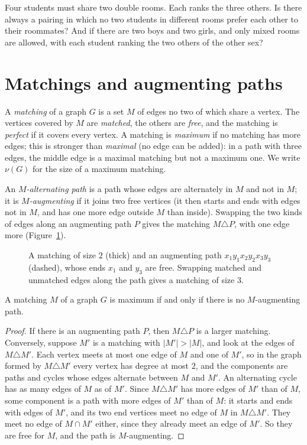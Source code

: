 \begin{think}
Four students must share two double rooms. Each ranks the three others. Is there always a pairing in which no two students
in different rooms prefer each other to their roommates? And if there are two boys and two girls, and only mixed rooms are
allowed, with each student ranking the two others of the other sex?
\end{think}

\section{Matchings and augmenting paths}

A \emph{matching} of a graph $G$ is a set $M$ of edges no two of which share a vertex. The vertices covered by $M$ are \emph{matched},
the others are \emph{free}, and the matching is \emph{perfect} if it covers every vertex. A matching is \emph{maximum} if no matching has more
edges; this is stronger than \emph{maximal} (no edge can be added): in a path with three edges, the middle edge is a maximal
matching but not a maximum one. We write $\nu(G)$ for the size of a maximum matching.

An \emph{$M$-alternating path} is a path whose edges are alternately in $M$ and not in $M$; it is \emph{$M$-augmenting} if it joins two free
vertices (it then starts and ends with edges not in $M$, and has one more edge outside $M$ than inside). Swapping the two kinds
of edges along an augmenting path $P$ gives the matching $M\triangle P$, with one edge more (Figure~\ref{fig:augmenting}).

\begin{figure}[ht]
\centering
{}
\caption{A matching of size $2$ (thick) and an augmenting path $x_1y_1x_2y_2x_3y_3$ (dashed), whose ends $x_1$ and $y_3$ are free.
Swapping matched and unmatched edges along the path gives a matching of size $3$.}
\label{fig:augmenting}
\end{figure}

\begin{theorem}[Berge, 1957]\label{thm:berge}
A matching $M$ of a graph $G$ is maximum if and only if there is no $M$-augmenting path.
\end{theorem}
\begin{proof}
If there is an augmenting path $P$, then $M\triangle P$ is a larger matching. Conversely, suppose $M'$ is a matching with $|M'|>|M|$, and
look at the edges of $M\triangle M'$. Each vertex meets at most one edge of $M$ and one of $M'$, so in the graph formed by $M\triangle M'$ every
vertex has degree at most $2$, and the components are paths and cycles whose edges alternate between $M$ and $M'$. An alternating
cycle has as many edges of $M$ as of $M'$. Since $M\triangle M'$ has more edges of $M'$ than of $M$, some component is a path with more
edges of $M'$ than of $M$: it starts and ends with edges of $M'$, and its two end vertices meet no edge of $M$ in $M\triangle M'$. They meet no edge
of $M\cap M'$ either, since they already meet an edge of $M'$. So they are free for $M$, and the path is $M$-augmenting.
\end{proof}

